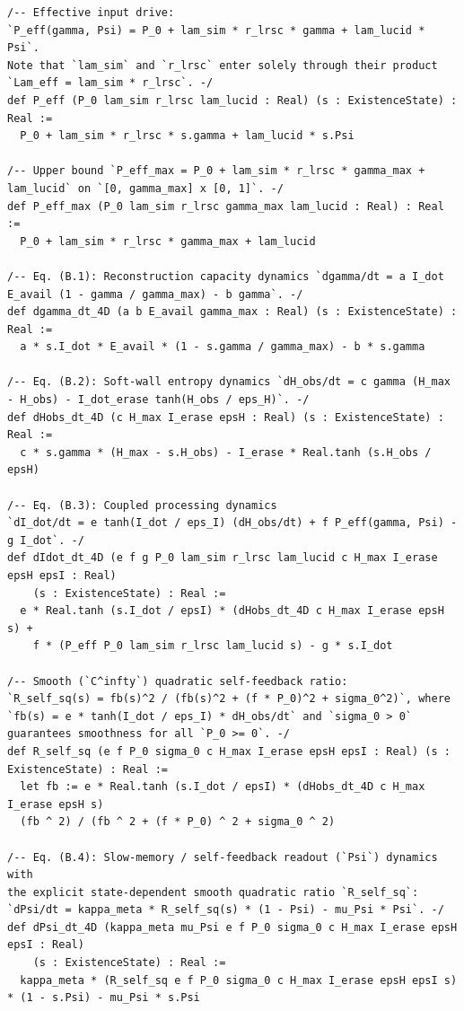 \documentclass[11pt,a4paper]{article}
\theoremstyle{definition}
\begin{document}
\begin{lstlisting}[language=Lean4]
/-- Effective input drive:
`P_eff(gamma, Psi) = P_0 + lam_sim * r_lrsc * gamma + lam_lucid * Psi`.
Note that `lam_sim` and `r_lrsc` enter solely through their product `Lam_eff = lam_sim * r_lrsc`. -/
def P_eff (P_0 lam_sim r_lrsc lam_lucid : Real) (s : ExistenceState) : Real :=
  P_0 + lam_sim * r_lrsc * s.gamma + lam_lucid * s.Psi

/-- Upper bound `P_eff_max = P_0 + lam_sim * r_lrsc * gamma_max + lam_lucid` on `[0, gamma_max] x [0, 1]`. -/
def P_eff_max (P_0 lam_sim r_lrsc gamma_max lam_lucid : Real) : Real :=
  P_0 + lam_sim * r_lrsc * gamma_max + lam_lucid

/-- Eq. (B.1): Reconstruction capacity dynamics `dgamma/dt = a I_dot E_avail (1 - gamma / gamma_max) - b gamma`. -/
def dgamma_dt_4D (a b E_avail gamma_max : Real) (s : ExistenceState) : Real :=
  a * s.I_dot * E_avail * (1 - s.gamma / gamma_max) - b * s.gamma

/-- Eq. (B.2): Soft-wall entropy dynamics `dH_obs/dt = c gamma (H_max - H_obs) - I_dot_erase tanh(H_obs / eps_H)`. -/
def dHobs_dt_4D (c H_max I_erase epsH : Real) (s : ExistenceState) : Real :=
  c * s.gamma * (H_max - s.H_obs) - I_erase * Real.tanh (s.H_obs / epsH)

/-- Eq. (B.3): Coupled processing dynamics
`dI_dot/dt = e tanh(I_dot / eps_I) (dH_obs/dt) + f P_eff(gamma, Psi) - g I_dot`. -/
def dIdot_dt_4D (e f g P_0 lam_sim r_lrsc lam_lucid c H_max I_erase epsH epsI : Real)
    (s : ExistenceState) : Real :=
  e * Real.tanh (s.I_dot / epsI) * (dHobs_dt_4D c H_max I_erase epsH s) +
    f * (P_eff P_0 lam_sim r_lrsc lam_lucid s) - g * s.I_dot

/-- Smooth (`C^infty`) quadratic self-feedback ratio:
`R_self_sq(s) = fb(s)^2 / (fb(s)^2 + (f * P_0)^2 + sigma_0^2)`, where
`fb(s) = e * tanh(I_dot / eps_I) * dH_obs/dt` and `sigma_0 > 0` guarantees smoothness for all `P_0 >= 0`. -/
def R_self_sq (e f P_0 sigma_0 c H_max I_erase epsH epsI : Real) (s : ExistenceState) : Real :=
  let fb := e * Real.tanh (s.I_dot / epsI) * (dHobs_dt_4D c H_max I_erase epsH s)
  (fb ^ 2) / (fb ^ 2 + (f * P_0) ^ 2 + sigma_0 ^ 2)

/-- Eq. (B.4): Slow-memory / self-feedback readout (`Psi`) dynamics with
the explicit state-dependent smooth quadratic ratio `R_self_sq`:
`dPsi/dt = kappa_meta * R_self_sq(s) * (1 - Psi) - mu_Psi * Psi`. -/
def dPsi_dt_4D (kappa_meta mu_Psi e f P_0 sigma_0 c H_max I_erase epsH epsI : Real)
    (s : ExistenceState) : Real :=
  kappa_meta * (R_self_sq e f P_0 sigma_0 c H_max I_erase epsH epsI s) * (1 - s.Psi) - mu_Psi * s.Psi


\end{lstlisting}
\end{document}
